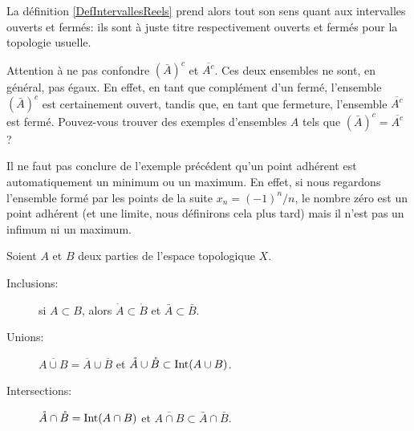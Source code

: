 \begin{remark}
  La définition \ref{DefIntervallesReels} prend alors tout son sens quant aux intervalles ouverts et fermés: ils sont à juste titre respectivement ouverts et fermés pour la topologie usuelle.
\end{remark}

\begin{remark}
  Attention à ne pas confondre $(\bar A)^c$ et
  $\overline{ A^c }$. Ces deux ensembles ne sont, en général, pas
  égaux. En effet, en tant que complément d'un fermé, l'ensemble
  $(\bar A)^c$ est certainement ouvert, tandis que, en tant
  que fermeture, l'ensemble $\overline{ A^c }$ est
  fermé. Pouvez-vous trouver des exemples d'ensembles $A$ tels que
  $(\bar A)^c=\overline{ A^c }$ ?
\end{remark}


\begin{example}		\label{ParlerEncoredeF}
	Il ne faut pas conclure de l'exemple précédent qu'un point adhérent est automatiquement un minimum ou un maximum. En effet, si nous regardons l'ensemble formé par les points de la suite $x_n=(-1)^n/n$, le nombre zéro est un point adhérent (et une limite, nous définirons cela plus tard) mais il n'est pas un infimum ni un maximum.
\end{example}

\begin{proposition}
	Soient $A$ et $B$ deux parties de l'espace topologique $X$.
	\begin{description}
		\item [Inclusions:]
                  si $A\subset B$, alors $\mathring A \subset \mathring B$ et $\bar A\subset\bar B$.
		\item [Unions:]
                  $\overline{ A\cup B }=\overline{ A }\cup\overline{ B }$ et $\mathring A \cup \mathring B \subset \operatorname{Int}(A\cup B)$.
		\item [Intersections:] $\mathring A \cap\mathring B =\operatorname{Int}(A\cap B)$ et $\overline{ A\cap B }\subset\bar A\cap\bar B$.
	\end{description}
\end{proposition}

